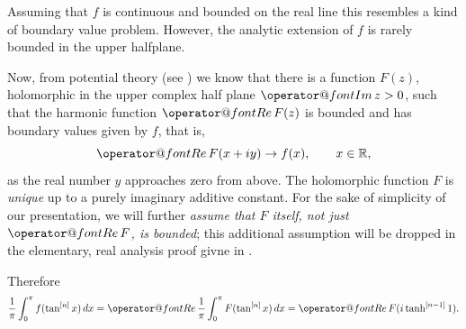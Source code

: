 \documentclass{amsart}
\makeatletter
\theoremstyle{plain}
\numberwithin{equation}{section}
\newcommand{\R}{{\mathbb  R}}
\renewcommand{\Re}{{\operator@font Re\,}}
\renewcommand{\Im}{{\operator@font Im\,}}
\makeatother
\begin{document}
Assuming that $f$ is continuous and bounded on the real line this resembles a kind of boundary value problem. However, the analytic extension of $f$ is rarely bounded in the upper halfplane.

Now, from potential theory (see \cite[Thms. 15.1a, 15.4d]{Hen}) we know that there is a function $F(z)$, holomorphic
in the upper complex half plane $\Im z >0$, such that the harmonic function $\Re F(z)$ is bounded and has boundary values given by $f$, that is,
\begin{equation}\label{eq.F}
\Re F(x+ i y) \to f(x), \qquad x\in\R,
\end{equation}
as the real number $y$ approaches zero from above. The holomorphic function $F$ is \emph{unique}
up to a purely imaginary additive constant. For the sake of simplicity of our presentation, we will further
{\em assume that $F$ itself, not just $\Re F$, is bounded}\/; this additional assumption will be dropped
in the elementary, real analysis proof givne in \cite{BornemannSchmelzer}.

Therefore
\[
\frac{1}{\pi}\int_0^\pi f(\tan^{[n]}x)\,dx = \Re \frac{1}{\pi} \int_0^\pi F(\tan^{[n]}x)\,dx = \Re F(i \tanh^{[n-1]}1).
\]





\end{document}
